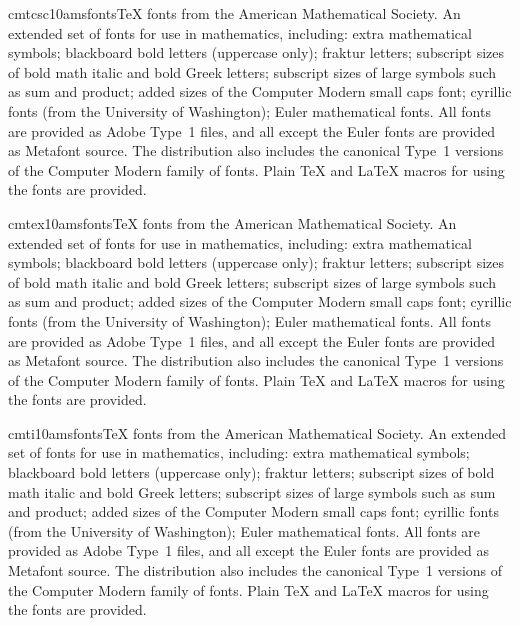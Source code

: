 \documentclass{ddltxtyp}
\begin{document}
\begin{package}{cmtcsc10}{amsfonts}{{\TeX} fonts from the American Mathematical Society.}
An extended set of fonts for use in mathematics, including:
extra mathematical symbols; blackboard bold letters (uppercase
only); fraktur letters; subscript sizes of bold math italic and
bold Greek letters; subscript sizes of large symbols such as
sum and product; added sizes of the Computer Modern small caps
font; cyrillic fonts (from the University of Washington); Euler
mathematical fonts. All fonts are provided as Adobe Type~1
files, and all except the Euler fonts are provided as Metafont
source. The distribution also includes the canonical Type~1
versions of the Computer Modern family of fonts. Plain {\TeX} and
{\LaTeX} macros for using the fonts are provided.
\end{package}
\begin{package}{cmtex10}{amsfonts}{{\TeX} fonts from the American Mathematical Society.}
An extended set of fonts for use in mathematics, including:
extra mathematical symbols; blackboard bold letters (uppercase
only); fraktur letters; subscript sizes of bold math italic and
bold Greek letters; subscript sizes of large symbols such as
sum and product; added sizes of the Computer Modern small caps
font; cyrillic fonts (from the University of Washington); Euler
mathematical fonts. All fonts are provided as Adobe Type~1
files, and all except the Euler fonts are provided as Metafont
source. The distribution also includes the canonical Type~1
versions of the Computer Modern family of fonts. Plain {\TeX} and
{\LaTeX} macros for using the fonts are provided.
\end{package}
\begin{package}{cmti10}{amsfonts}{{\TeX} fonts from the American Mathematical Society.}
An extended set of fonts for use in mathematics, including:
extra mathematical symbols; blackboard bold letters (uppercase
only); fraktur letters; subscript sizes of bold math italic and
bold Greek letters; subscript sizes of large symbols such as
sum and product; added sizes of the Computer Modern small caps
font; cyrillic fonts (from the University of Washington); Euler
mathematical fonts. All fonts are provided as Adobe Type~1
files, and all except the Euler fonts are provided as Metafont
source. The distribution also includes the canonical Type~1
versions of the Computer Modern family of fonts. Plain {\TeX} and
{\LaTeX} macros for using the fonts are provided.
\end{package}
\end{document}
